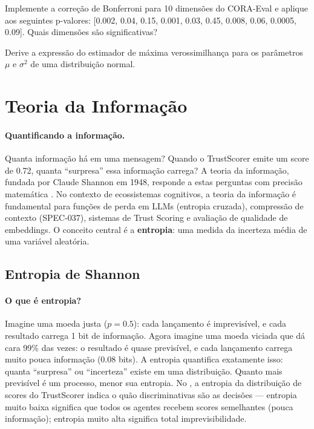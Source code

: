 \begin{exercicio}
    Implemente a correção de Bonferroni para 10 dimensões do CORA-Eval e
    aplique aos seguintes p-valores: [0.002, 0.04, 0.15, 0.001, 0.03, 0.45,
    0.008, 0.06, 0.0005, 0.09]. Quais dimensões são significativas?
\end{exercicio}

\begin{exercicio}
    Derive a expressão do estimador de máxima verossimilhança para os
    parâmetros $\mu$ e $\sigma^2$ de uma distribuição normal.
\end{exercicio}

\section{Teoria da Informação}
\label{sec:teoria-informacao}
\nivelavancado

\paragraph{Quantificando a informação.} Quanta informação há em uma
mensagem? Quando o TrustScorer emite um score de 0.72, quanta ``surpresa''
essa informação carrega? A teoria da informação, fundada por Claude Shannon
em 1948, responde a estas perguntas com precisão matemática
\cite{cover2006elements, goodfellow2016deep}. No contexto de ecossistemas
cognitivos, a teoria da informação é fundamental para funções de perda em
LLMs (entropia cruzada), compressão de contexto (SPEC-037), sistemas de
Trust Scoring e avaliação de qualidade de embeddings. O conceito central é
a \textbf{entropia}: uma medida da incerteza média de uma variável aleatória.

\subsection{Entropia de Shannon}

\paragraph{O que é entropia?} Imagine uma moeda justa ($p = 0.5$): cada
lançamento é imprevisível, e cada resultado carrega 1 bit de informação.
Agora imagine uma moeda viciada que dá cara 99\% das vezes: o resultado é
quase previsível, e cada lançamento carrega muito pouca informação (0.08
bits). A entropia quantifica exatamente isso: quanta ``surpresa'' ou
``incerteza'' existe em uma distribuição. Quanto mais previsível é um
processo, menor sua entropia. No \opencodeeco{}, a entropia da distribuição
de scores do TrustScorer indica o quão discriminativas são as decisões ---
entropia muito baixa significa que todos os agentes recebem scores
semelhantes (pouca informação); entropia muito alta significa total
imprevisibilidade.

